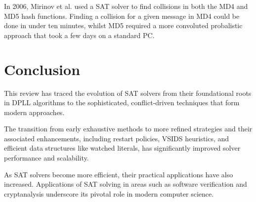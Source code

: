 \documentclass[conference]{IEEEtran}
\begin{document}
In 2006, Mirinov et al. used a SAT solver to find collisions in both the MD4 and MD5 hash functions. Finding a collision for a given message in MD4 could be done in under ten minutes, whilst MD5 required a more convoluted probalistic approach that took a few days on a standard PC.

\section{Conclusion}
This review has traced the evolution of SAT solvers from their foundational roots in DPLL algorithms to the sophisticated, conflict-driven techniques that form modern approaches.

The transition from early exhaustive methods to more refined strategies and their associated enhancements, including restart policies, VSIDS heuristics, and efficient data structures like watched literals, has significantly improved solver performance and scalability.

As SAT solvers become more efficient, their practical applications have also increased. Applications of SAT solving in areas such as software verification and cryptanalysis underscore its pivotal role in modern computer science.



\end{document}
